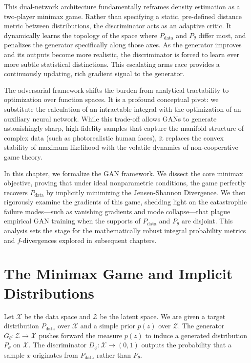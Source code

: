 This dual-network architecture fundamentally reframes density estimation as a two-player minimax game. Rather than specifying a static, pre-defined distance metric between distributions, the discriminator acts as an adaptive critic. It dynamically learns the topology of the space where $P_{\text{data}}$ and $P_\theta$ differ most, and penalizes the generator specifically along those axes. As the generator improves and its outputs become more realistic, the discriminator is forced to learn ever more subtle statistical distinctions. This escalating arms race provides a continuously updating, rich gradient signal to the generator.

The adversarial framework shifts the burden from analytical tractability to optimization over function spaces. It is a profound conceptual pivot: we substitute the calculation of an intractable integral with the optimization of an auxiliary neural network. While this trade-off allows GANs to generate astonishingly sharp, high-fidelity samples that capture the manifold structure of complex data (such as photorealistic human faces), it replaces the convex stability of maximum likelihood with the volatile dynamics of non-cooperative game theory.

In this chapter, we formalize the GAN framework. We dissect the core minimax objective, proving that under ideal nonparametric conditions, the game perfectly recovers $P_{\text{data}}$ by implicitly minimizing the Jensen-Shannon Divergence. We then rigorously examine the gradients of this game, shedding light on the catastrophic failure modes---such as vanishing gradients and mode collapse---that plague empirical GAN training when the supports of $P_{\text{data}}$ and $P_\theta$ are disjoint. This analysis sets the stage for the mathematically robust integral probability metrics and $f$-divergences explored in subsequent chapters.

\section{The Minimax Game and Implicit Distributions}

Let $\mathcal{X}$ be the data space and $\mathcal{Z}$ be the latent space. We are given a target distribution $P_{\text{data}}$ over $\mathcal{X}$ and a simple prior $p(z)$ over $\mathcal{Z}$. The generator $G_\theta: \mathcal{Z} \to \mathcal{X}$ pushes forward the measure $p(z)$ to induce a generated distribution $P_\theta$ on $\mathcal{X}$. The discriminator $D_\phi: \mathcal{X} \to (0, 1)$ outputs the probability that a sample $x$ originates from $P_{\text{data}}$ rather than $P_\theta$.

